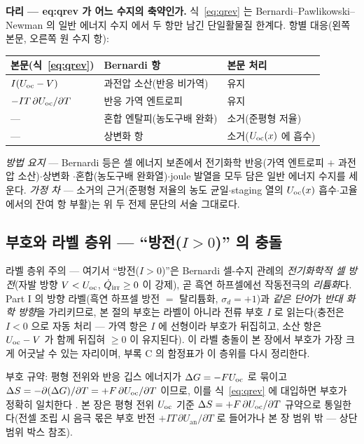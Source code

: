 \begin{srcbox}
\textbf{다리 --- eq:qrev 가 어느 수지의 축약인가.} 식~\eqref{eq:qrev} 는 Bernardi--Pawlikowski--Newman 의
일반 에너지 수지\cite{bernardi1985} 에서 두 항만 남긴 단일활물질 한계다. 항별 대응(왼쪽 본문, 오른쪽 원
수지 항):
\begin{center}\footnotesize
\begin{tabular}{@{}lll@{}}
\hline
본문(식~\eqref{eq:qrev}) & Bernardi\cite{bernardi1985} 항 & 본문 처리 \\
\hline
$I(U_{\mathrm{oc}}-V)$ & 과전압 소산(반응 비가역) & 유지 \\
$-IT\,\partial U_{\mathrm{oc}}/\partial T$ & 반응 가역 엔트로피 & 유지 \\
--- & 혼합 엔탈피(농도구배 완화) & 소거(준평형 저율) \\
--- & 상변화 항 & 소거($U_{\mathrm{oc}}(x)$ 에 흡수) \\
\hline
\end{tabular}
\end{center}
\emph{방법 요지} --- Bernardi 등은 셀 에너지 보존에서 전기화학 반응(가역 엔트로피 $+$ 과전압 소산)$\cdot$상변화
$\cdot$혼합(농도구배 완화열)$\cdot$joule 발열을 모두 담은 일반 에너지 수지를 세운다. \emph{가정 차} --- 소거의 근거(준평형 저율의 농도 균일$\cdot$staging 열의 $U_{\mathrm{oc}}(x)$ 흡수$\cdot$고율에서의 잔여 항 부활)는 위 두 전제 문단의 서술 그대로다.
\end{srcbox}

\subsection{부호와 라벨 층위 --- ``방전($I>0$)'' 의 충돌}\label{ssec:signlabel}
라벨 층위 주의 --- 여기서 ``방전($I>0$)''은 Bernardi 셀-수지 관례의 \emph{전기화학적 셀 방전}(자발 방향
$V<U_{\mathrm{oc}}$, $\dot Q_{\mathrm{irr}}\ge0$ 이 강제), 곧 흑연 하프셀에선 작동전극의 \emph{리튬화}다. Part I 의 방향
라벨(흑연 하프셀 방전 $=$ 탈리튬화, $\sigma_d{=}+1$)과 \emph{같은 단어}가 \emph{반대 화학 방향}을 가리키므로,
본 절의 부호는 라벨이 아니라 전류 부호 $I$ 로 읽는다(충전은 $I<0$ 으로 자동 처리 --- 가역 항은 $I$ 에
선형이라 부호가 뒤집히고, 소산 항은 $U_{\mathrm{oc}}-V$ 가 함께 뒤집혀 $\ge0$ 이 유지된다). 이 라벨 충돌이 본 장에서 부호가 가장 크게 어긋날 수 있는 자리이며, 부록 C 의 함정표가 이
층위를 다시 정리한다.
\begin{srcbox}
부호 규약: 평형 전위와 반응 깁스 에너지가 $\Delta G=-FU_{\mathrm{oc}}$ 로 묶이고 $\Delta S=-\partial(\Delta
G)/\partial T=+F\,\partial U_{\mathrm{oc}}/\partial T$ 이므로, 이를 식~\eqref{eq:qrev} 에 대입하면 부호가 정확히 일치한다
\cite{newman,msmr_partI}. 본 장은 평형 전위 $U_{\mathrm{oc}}$ 기준 $\Delta S=+F\,\partial U_{\mathrm{oc}}/\partial T$ 규약으로
통일한다(전셀 조립 시 음극 몫은 부호 반전 $+IT\,\partial U_\mathrm{an}/\partial T$ 로 들어가나 본 장 범위 밖 ---
상단 범위 박스 참조).
\end{srcbox}


